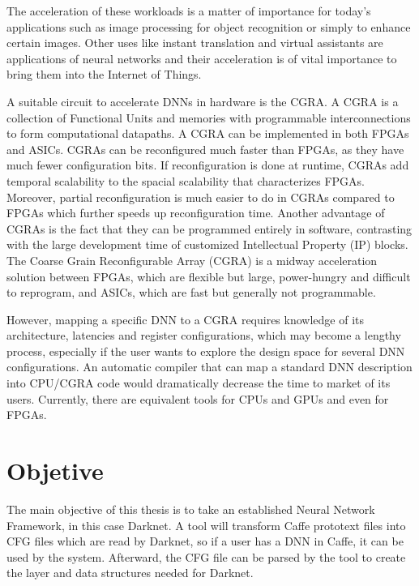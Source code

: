 The acceleration of these workloads is a matter of importance for today's
applications such as image processing for object recognition or simply to
enhance certain images. Other uses like instant translation and virtual
assistants are applications of neural networks and their acceleration is of
vital importance to bring them into the Internet of Things.

A suitable circuit to accelerate DNNs in hardware is the CGRA. A CGRA is a
collection of Functional Units and memories with programmable interconnections
to form computational datapaths. A CGRA can be implemented in both
FPGAs and ASICs. CGRAs can be reconfigured much faster than FPGAs, as they have
much fewer configuration bits. If reconfiguration is done at runtime, CGRAs add
temporal scalability to the spacial scalability that characterizes
FPGAs. Moreover, partial reconfiguration is much easier to do in CGRAs compared
to FPGAs which further speeds up reconfiguration time. Another advantage of
CGRAs is the fact that they can be programmed entirely in software, contrasting
with the large development time of customized Intellectual Property (IP) blocks.
The Coarse Grain Reconfigurable Array (CGRA) is a midway acceleration solution
between FPGAs, which are flexible but large, power-hungry and difficult to
reprogram, and ASICs, which are fast but generally not programmable.

However, mapping a specific DNN to a CGRA requires knowledge of its
architecture, latencies and register configurations, which may become a lengthy
process, especially if the user wants to explore the design space for several
DNN configurations. An automatic compiler that can map a standard DNN
description into CPU/CGRA code would dramatically decrease the time to market of its
users. Currently, there are equivalent tools for CPUs and GPUs and
even for FPGAs.


\section{Objetive}
\label{section:objetctive}

The main objective of this thesis is to take an established Neural Network Framework, in this case
Darknet\cite{Darknet}. A tool will transform Caffe prototext files into CFG files
which are read by Darknet, so if a user has a DNN in Caffe, it can be used by the system.
Afterward, the CFG file can be parsed by the tool to create the layer and data structures
needed for Darknet.

